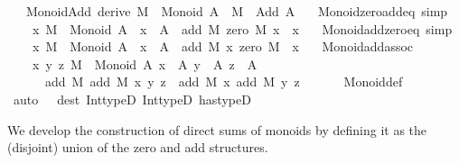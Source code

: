 \begin{isabellebody}
\ \ \ Monoid{\isacharunderscore}{\kern0pt}Add\ {\isacharbrackleft}{\kern0pt}derive{\isacharbrackright}{\kern0pt}{\isacharcolon}{\kern0pt}\ {\isachardoublequoteopen}M\ {\isacharcolon}{\kern0pt}\ Monoid\ A\ {\isasymLongrightarrow}\ M\ {\isacharcolon}{\kern0pt}\ Add\ A{\isachardoublequoteclose}\isanewline
\ \ \ Monoid{\isacharunderscore}{\kern0pt}zero{\isacharunderscore}{\kern0pt}add{\isacharunderscore}{\kern0pt}eq\ {\isacharbrackleft}{\kern0pt}simp{\isacharbrackright}{\kern0pt}{\isacharcolon}{\kern0pt}\isanewline
\ \ \ \ {\isachardoublequoteopen}{\isasymAnd}x{\isachardot}{\kern0pt}\ M\ {\isacharcolon}{\kern0pt}\ Monoid\ A\ {\isasymLongrightarrow}\ x\ {\isacharcolon}{\kern0pt}\ A\ {\isasymLongrightarrow}\ add\ M\ {\isacharparenleft}{\kern0pt}zero\ M{\isacharparenright}{\kern0pt}\ x\ {\isacharequal}{\kern0pt}\ x{\isachardoublequoteclose}\isanewline
\ \ \ Monoid{\isacharunderscore}{\kern0pt}add{\isacharunderscore}{\kern0pt}zero{\isacharunderscore}{\kern0pt}eq\ {\isacharbrackleft}{\kern0pt}simp{\isacharbrackright}{\kern0pt}{\isacharcolon}{\kern0pt}\isanewline
\ \ \ \ {\isachardoublequoteopen}{\isasymAnd}x{\isachardot}{\kern0pt}\ M\ {\isacharcolon}{\kern0pt}\ Monoid\ A\ {\isasymLongrightarrow}\ x\ {\isacharcolon}{\kern0pt}\ A\ {\isasymLongrightarrow}\ add\ M\ x\ {\isacharparenleft}{\kern0pt}zero\ M{\isacharparenright}{\kern0pt}\ {\isacharequal}{\kern0pt}\ x{\isachardoublequoteclose}\isanewline
\ \ \ Monoid{\isacharunderscore}{\kern0pt}add{\isacharunderscore}{\kern0pt}assoc{\isacharcolon}{\kern0pt}\isanewline
\ \ \ \ {\isachardoublequoteopen}{\isasymAnd}x\ y\ z{\isachardot}{\kern0pt}\ {\isasymlbrakk}M\ {\isacharcolon}{\kern0pt}\ Monoid\ A{\isacharsemicolon}{\kern0pt}\ x\ {\isacharcolon}{\kern0pt}\ A{\isacharsemicolon}{\kern0pt}\ y\ {\isacharcolon}{\kern0pt}\ A{\isacharsemicolon}{\kern0pt}\ z\ {\isacharcolon}{\kern0pt}\ A{\isasymrbrakk}\ {\isasymLongrightarrow}\isanewline
\ \ \ \ \ \ add\ M\ {\isacharparenleft}{\kern0pt}add\ M\ x\ y{\isacharparenright}{\kern0pt}\ z\ {\isacharequal}{\kern0pt}\ add\ M\ x\ {\isacharparenleft}{\kern0pt}add\ M\ y\ z{\isacharparenright}{\kern0pt}{\isachardoublequoteclose}\isanewline
\ \ \isanewline
%
\isadelimproof
\ \ %
\endisadelimproof
%
\isatagproof
{}\isamarkupfalse%
\ Monoid{\isacharunderscore}{\kern0pt}def\ \isamarkupfalse%
\ {\isacharparenleft}{\kern0pt}auto\ {}\ {}\ dest{\isacharbang}{\kern0pt}{\isacharcolon}{\kern0pt}\ Int{\isacharunderscore}{\kern0pt}typeD{}\ Int{\isacharunderscore}{\kern0pt}typeD{}\ has{\isacharunderscore}{\kern0pt}typeD{\isacharparenright}{\kern0pt}%
\endisatagproof
{\isafoldproof}%
%
\isadelimproof
%
\endisadelimproof
%
\isadelimdocument
%
\endisadelimdocument
%
\isatagdocument
%
\isamarkuptrue%
%
\endisatagdocument
{\isafolddocument}%
%
\isadelimdocument
%
\endisadelimdocument
%
\begin{isamarkuptext}%
We develop the construction of direct sums of monoids by defining it as
the (disjoint) union of the zero and add structures.


\end{isamarkuptext}
\end{isabellebody}
